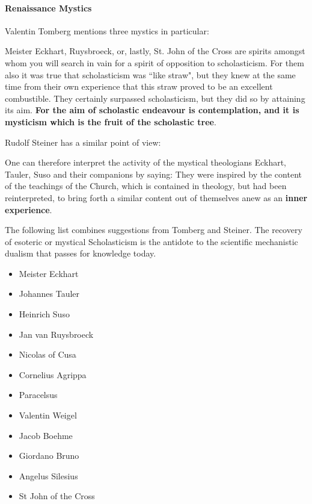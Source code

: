 \paragraph{Renaissance Mystics}
Valentin Tomberg mentions three mystics in particular:

\begin{quotex}
Meister Eckhart, Ruysbroeck, or, lastly, St. John of the Cross are spirits amongst whom you will search in vain for a spirit of opposition to scholasticism. For them also it was true that scholasticism was ``like straw", but they knew at the same time from their own experience that this straw proved to be an excellent combustible. They certainly surpassed scholasticism, but they did so by attaining its aim. \textbf{For the aim of scholastic endeavour is contemplation, and it is mysticism which is the fruit of the scholastic tree}. 

\end{quotex}
Rudolf Steiner has a similar point of view:

\begin{quotex}
One can therefore interpret the activity of the mystical theologians Eckhart, Tauler, Suso and their companions by saying: They were inspired by the content of the teachings of the Church, which is contained in theology, but had been reinterpreted, to bring forth a similar content out of themselves anew as an \textbf{inner experience}. 

\end{quotex}
The following list combines suggestions from Tomberg and Steiner. The recovery of esoteric or mystical Scholasticism is the antidote to the scientific mechanistic dualism that passes for knowledge today.

\begin{itemize}
\item Meister Eckhart 
\item Johannes Tauler 
\item Heinrich Suso 
\item Jan van Ruysbroeck 
\item Nicolas of Cusa 
\item Cornelius Agrippa 
\item Paracelsus 
\item Valentin Weigel 
\item Jacob Boehme 
\item Giordano Bruno 
\item Angelus Silesius 
\item St John of the Cross 
\end{itemize}


